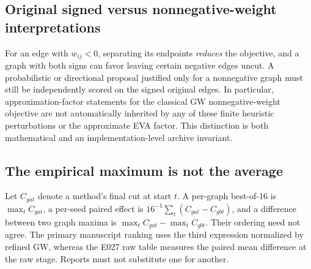 \subsection{Original signed versus nonnegative-weight interpretations}
For an edge with $w_{ij}<0$, separating its endpoints \emph{reduces} the objective, and a graph with both signs can favor leaving certain negative edges uncut. A probabilistic or directional proposal justified only for a nonnegative graph must still be independently scored on the signed original edges. In particular, approximation-factor statements for the classical GW nonnegative-weight objective are not automatically inherited by any of these finite heuristic perturbations or the approximate EVA factor. This distinction is both mathematical and an implementation-level archive invariant.

\subsection{The empirical maximum is not the average}
Let $C_{gat}$ denote a method's final cut at start $t$. A per-graph best-of-16 is $\max_t C_{gat}$, a per-seed paired effect is $16^{-1}\sum_t(C_{gat}-C_{gbt})$, and a difference between two graph maxima is $\max_t C_{gat}-\max_t C_{gbt}$. Their ordering need not agree. The primary manuscript ranking uses the third expression normalized by refined GW, whereas the E027 raw table measures the paired mean difference at the raw stage. Reports must not substitute one for another.
